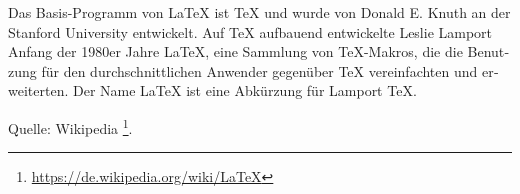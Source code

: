 \null\vfil
\begin{otherlanguage}{ngerman}
\begin{center}\textsf{\textbf{\abstractname}}\end{center}

\noindent Das Basis-Programm von LaTeX ist TeX und wurde von Donald E. Knuth an der Stanford University entwickelt. 
Auf TeX aufbauend entwickelte Leslie Lamport Anfang der 1980er Jahre LaTeX, eine Sammlung von TeX-Makros, 
die die Benutzung für den durchschnittlichen Anwender gegenüber TeX vereinfachten und erweiterten. 
Der Name LaTeX ist eine Abkürzung für Lamport TeX.

\hfill Quelle: Wikipedia \footnote{\url{https://de.wikipedia.org/wiki/LaTeX}}.  	

\end{otherlanguage}
\vfil\null 	
